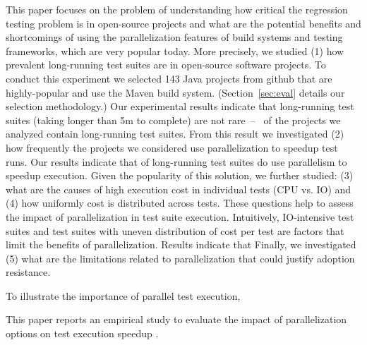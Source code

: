 \newcommand{\numSubjs}{143}
\newcommand{\numLongRunning}{\Fix{17\%}}
\newcommand{\percentParallelForLongRunning}{\Fix{80\%}}


This paper focuses on the problem of understanding how critical the
regression testing problem is in open-source projects and what are the
potential benefits and shortcomings of using the parallelization
features of build systems and testing frameworks, which are very
popular today.  More precisely, we studied (1) how
prevalent long-running test suites are in open-source software
projects.  To conduct this experiment we selected \numSubjs{} Java
projects from github that are highly-popular and use the Maven build
system.  (Section~\ref{sec:eval} details our selection methodology.)
Our experimental results indicate that long-running test suites
(taking longer than 5m to complete) are not
rare~--~\numLongRunning{} of the projects we analyzed contain
long-running test suites.  
From this result we investigated (2) how frequently the projects we
considered use parallelization to speedup test runs.  Our results
indicate that \percentParallelForLongRunning{} of long-running test
suites do use parallelism to speedup execution.  Given the popularity
of this solution, we further studied: (3) what are the causes of high
execution cost in individual tests (CPU vs. IO) and (4) how uniformly
cost is distributed across tests.  These questions help to assess the
impact of parallelization in test suite execution.  Intuitively,
IO-intensive test suites and test suites with uneven distribution of
cost per test are factors that limit the benefits of parallelization.
Results indicate that   Finally, we investigated (5) what are
the limitations related to parallelization that could justify adoption
resistance.

\Fix{--------------}

To illustrate the importance of parallel test execution, 

This paper reports an empirical study to evaluate the impact of
parallelization options on test execution speedup  .

